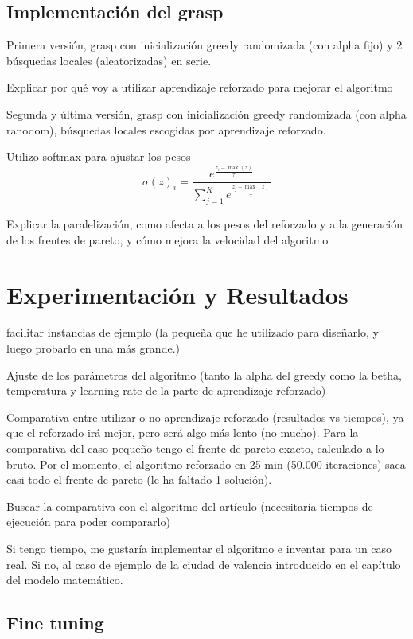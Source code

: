 \documentclass[12pt,a4paper]{book}
\begin{document}
\section{Implementación del grasp}
Primera versión, grasp con inicialización greedy randomizada (con alpha fijo) y 2 búsquedas locales (aleatorizadas) en serie.

Explicar por qué voy a utilizar aprendizaje reforzado para mejorar el algoritmo

Segunda y última versión, grasp con inicialización greedy randomizada (con alpha ranodom), búsquedas locales escogidas por aprendizaje reforzado.

Utilizo softmax para ajustar los pesos
$$
\sigma(z)_i = \frac{e^{\frac{z_i - \max(z)}{\tau}}}{\sum_{j=1}^{K} e^{\frac{z_j - \max(z)}{\tau}}}
$$

Explicar la paralelización, como afecta a los pesos del reforzado y a la generación de los frentes de pareto, y cómo mejora la velocidad del algoritmo

\chapter{Experimentación y Resultados}
facilitar instancias de ejemplo (la pequeña que he utilizado para diseñarlo, y luego probarlo en una más grande.)

Ajuste de los parámetros del algoritmo (tanto la alpha del greedy como la betha, temperatura y learning rate de la parte de aprendizaje reforzado)

Comparativa entre utilizar o no aprendizaje reforzado (resultados vs tiempos), ya que el reforzado irá mejor, pero será algo más lento (no mucho).
Para la comparativa del caso pequeño tengo el frente de pareto exacto, calculado a lo bruto. Por el momento, el algoritmo reforzado en 25 min (50.000 iteraciones) saca casi todo el frente de pareto (le ha faltado 1 solución).

Buscar la comparativa con el algoritmo del artículo (necesitaría tiempos de ejecución para poder compararlo)

Si tengo tiempo, me gustaría implementar el algoritmo e inventar para un caso real. Si no, al caso de ejemplo de la ciudad de valencia introducido en el capítulo del modelo matemático.

\section{Fine tuning}
\end{document}

